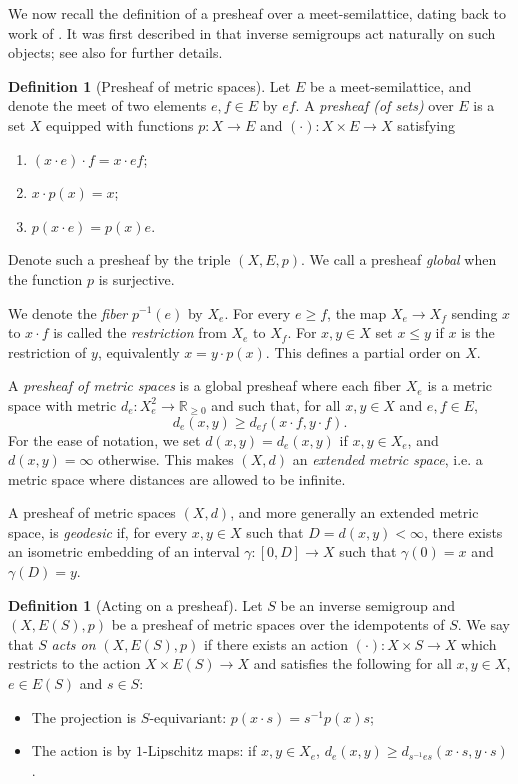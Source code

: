 \documentclass[svgnames]{amsart}
\theoremstyle{plain}
\theoremstyle{definition}
\newtheorem{defn}[thm]{Definition}
\begin{document}
\noindent We now recall the definition of a presheaf over a meet-semilattice, dating back to work of
\cite{Goldblatt}. It was first described in \cite{Steinberg_morita_eq} that inverse semigroups act naturally on such
objects; see also \cite{tesolin2025generalisationmunnsemigroup} for further details.


\begin{defn}[Presheaf of metric spaces]\label{defn:presheaf} Let $E$ be a meet-semilattice, and denote the meet of two elements $e,f\in E$ by $ef$.
A \emph{presheaf (of sets)} over $E$ is a set $X$ equipped with functions $p\colon X \to E$ and $(\cdot)\colon X \times E \to X$ satisfying
\begin{enumerate}
	\item 
	$(x \cdot e) \cdot f = x \cdot ef$;
	\item 
	$x \cdot p(x) = x$;
	\item 
	$p(x \cdot e) = p(x)e$.
\end{enumerate}
Denote such a presheaf by the triple $(X,E,p)$. We call a presheaf \emph{global} when the function $p$ is surjective. 

We denote the \emph{fiber} $p^{-1}(e)$ by $X_e$. For every $e\ge f$, the map $X_e\to X_f$ sending $x$ to $x\cdot f$ is called the \emph{restriction} from $X_e$ to $X_f$. For $x,y \in X$ set $x \leq y$ if $x$ is the restriction of $y$, equivalently $x = y \cdot p(x)$. This defines a partial order on $X$.

A \emph{presheaf of metric spaces} is a global presheaf where each fiber $X_{e}$ is a metric space with metric
$d_{e}\colon X_e^2\to \mathbb{R}_{\ge 0}$ and such that, for all $x,y \in X$ and $e,f \in E$,
 \[
	d_{e}(x,y) \geq d_{ef}(x \cdot f, y \cdot f)
.\]
For the ease of notation, we set $d(x,y)=d_e(x,y)$ if $x,y\in X_e$, and $d(x,y)=\infty$ otherwise. This makes $(X,d)$ an \emph{extended metric space}, i.e. a metric space where distances are allowed to be infinite.

A presheaf of metric spaces $(X,d)$, and more generally an extended metric space, is \emph{geodesic} if, for every $x,y\in X$ such that $D=d(x,y)<\infty$, there exists an isometric embedding of an interval $\gamma\colon [0,D]\to X$ such that $\gamma(0)=x$ and $\gamma(D)=y$.
\end{defn}


\begin{defn}[Acting on a presheaf]\label{defn:action}
Let $S$ be an inverse semigroup and $(X,E(S),p)$ be a presheaf of metric spaces over the idempotents of $S$. We say that $S$ \emph{acts on} $(X,E(S),p)$ if there exists an action $(\cdot)\colon X \times S \to X$ which restricts to the action $X \times E(S) \to X$ and satisfies the following for all $x,y\in X$, $e\in E(S)$ and $s\in S$:
\begin{itemize}
    \item The projection is $S$-equivariant: $p(x \cdot s) = s^{-1}p(x)s$;
    \item The action is by $1$-Lipschitz maps: if $x,y\in X_e$, $d_e(x,y) \geq d_{s^{-1}es}(x \cdot s, y \cdot s) $.
\end{itemize}
\end{defn}
\end{document}
